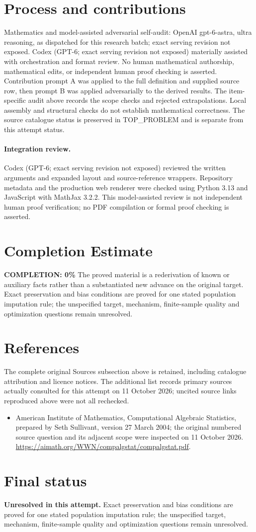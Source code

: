 \documentclass[11pt]{article}
\begin{document}
\section{Process and contributions}
Mathematics and model-assisted adversarial self-audit: OpenAI gpt-6-astra, ultra reasoning, as dispatched for this research batch; exact serving revision not exposed. Codex (GPT-6; exact serving revision not exposed) materially assisted with orchestration and format review. No human mathematical authorship, mathematical edits, or independent human proof checking is asserted.
Contribution prompt A was applied to the full definition and supplied source row, then prompt B was applied adversarially to the derived results. The item-specific audit above records the scope checks and rejected extrapolations. Local assembly and structural checks do not establish mathematical correctness. The source catalogue status is preserved in TOP\_PROBLEM and is separate from this attempt status.
\paragraph{Integration review.} Codex (GPT-6; exact serving revision not exposed) reviewed the written arguments and expanded layout and source-reference wrappers. Repository metadata and the production web renderer were checked using Python 3.13 and JavaScript with MathJax 3.2.2. This model-assisted review is not independent human proof verification; no PDF compilation or formal proof checking is asserted.

\section{Completion Estimate}
\noindent\textbf{COMPLETION: 0\%}
The proved material is a rederivation of known or auxiliary facts rather than a substantiated new advance on the original target. Exact preservation and bias conditions are proved for one stated population imputation rule; the unspecified target, mechanism, finite-sample quality and optimization questions remain unresolved.
\section{References}
The complete original Sources subsection above is retained, including catalogue attribution and licence notices. The additional list records primary sources actually consulted for this attempt on 11 October 2026; uncited source links reproduced above were not all rechecked.
\begin{itemize}
\item American Institute of Mathematics, Computational Algebraic Statistics, prepared by Seth Sullivant, version 27 March 2004; the original numbered source question and its adjacent scope were inspected on 11 October 2026. \url{https://aimath.org/WWN/compalgstat/compalgstat.pdf}.
\end{itemize}
\section{Final status}
\textbf{Unresolved in this attempt.} Exact preservation and bias conditions are proved for one stated population imputation rule; the unspecified target, mechanism, finite-sample quality and optimization questions remain unresolved.
\end{document}
